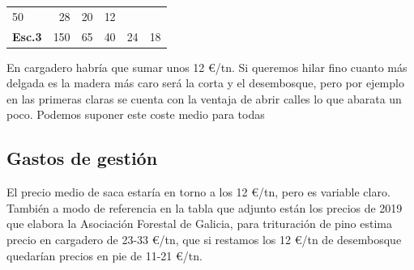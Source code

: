 \documentclass[]{article}
\begin{document}
\begin{longtable}[]{@{}lrrrrr@{}}
\begin{minipage}[t]{0.14\columnwidth}
50\strut
\end{minipage} & \begin{minipage}[t]{0.14\columnwidth}\raggedleft\strut
28\strut
\end{minipage} & \begin{minipage}[t]{0.14\columnwidth}\raggedleft\strut
20\strut
\end{minipage} & \begin{minipage}[t]{0.14\columnwidth}\raggedleft\strut
12\strut
\end{minipage}\tabularnewline
\begin{minipage}[t]{0.14\columnwidth}\raggedright\strut
\textbf{Esc.3}\strut
\end{minipage} & \begin{minipage}[t]{0.14\columnwidth}\raggedleft\strut
150\strut
\end{minipage} & \begin{minipage}[t]{0.14\columnwidth}\raggedleft\strut
65\strut
\end{minipage} & \begin{minipage}[t]{0.14\columnwidth}\raggedleft\strut
40\strut
\end{minipage} & \begin{minipage}[t]{0.14\columnwidth}\raggedleft\strut
24\strut
\end{minipage} & \begin{minipage}[t]{0.14\columnwidth}\raggedleft\strut
18\strut
\end{minipage}\tabularnewline
\bottomrule
\end{longtable}

En cargadero habría que sumar unos 12 \euro/tn. Si queremos hilar fino
cuanto más delgada es la madera más caro será la corta y el desembosque,
pero por ejemplo en las primeras claras se cuenta con la ventaja de
abrir calles lo que abarata un poco. Podemos suponer este coste medio
para todas

\subsection{Gastos de gestión}\label{gastos-de-gestiuxf3n}

El precio medio de saca estaría en torno a los 12 \euro/tn, pero es
variable claro. También a modo de referencia en la tabla que adjunto
están los precios de 2019 que elabora la Asociación Forestal de Galicia,
para trituración de pino estima precio en cargadero de 23-33 \euro/tn,
que si restamos los 12 \euro/tn de desembosque quedarían precios en pie
de 11-21 \euro/tn.
\end{document}
